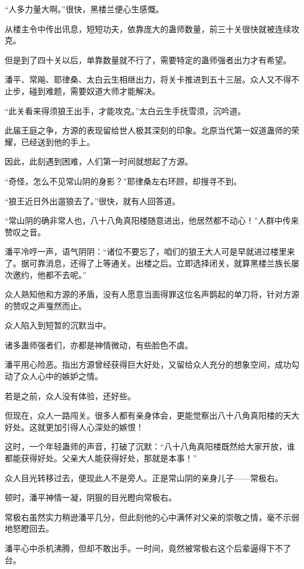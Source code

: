 \begin{this_body}
“人多力量大啊。”很快，黑楼兰便心生感慨。

从楼主令中传出讯息，短短功夫，依靠庞大的蛊师数量，前三十关很快就被连续攻克。

但是到了四十关以后，单靠数量就不行了，需要特定的蛊师强者出力才有希望。

潘平、常飚、耶律桑、太白云生相继出力，将关卡推进到五十三层。众人又不得不止步，碰到难题，需要奴道大师才能解决。

“此关看来得须狼王出手，才能攻克。”太白云生手抚雪须，沉吟道。

此届王庭之争，方源的表现留给世人极其深刻的印象。北原当代第一奴道蛊师的荣耀，已经送到他的手上。

因此，此刻遇到困难，人们第一时间就想起了方源。

“奇怪，怎么不见常山阴的身影？”耶律桑左右环顾，却搜寻不到。

“狼王近日外出遛狼去了。”很快，就有人回答道。

“常山阴的确非常人也，八十八角真阳楼随意进出，他居然都不动心！”人群中传来赞叹之音。

潘平冷哼一声，语气阴阴：“诸位不要忘了，咱们的狼王大人可是早就进过楼里来了。据可靠消息，还得了上等通关。出楼之后。立即选择闭关，就算黑楼兰族长屡次邀约，他都不去呢。”

众人熟知他和方源的矛盾，没有人愿意当面得罪这位名声鹊起的单刀将，针对方源的赞叹之声戛然而止。

众人陷入到短暂的沉默当中。

诸多蛊师强者们，亦都是神情微动，有些脸色不虞。

潘平用心险恶。指出方源曾经获得巨大好处，又留给众人充分的想象空间，成功勾动了众人心中的嫉妒之情。

若是之前，众人没有体验，还好些。

但现在，众人一路闯关。很多人都有亲身体会，更能觉察出八十八角真阳楼的天大好处。这就更加引得人心深处的嫉恨！

这时，一个年轻蛊师的声音，打破了沉默：“八十八角真阳楼既然给大家开放，谁都能获得好处。父亲大人能获得好处，那就是本事！”

众人目光转移过去，便现此人不是旁人。正是常山阴的亲身儿子——常极右。

顿时，潘平神情一凝，阴狠的目光瞪向常极右。

常极右虽然实力稍逊潘平几分，但此刻他的心中满怀对父亲的崇敬之情，毫不示弱地怒瞪回去。

潘平心中杀机沸腾，但却不敢出手。一时间，竟然被常极右这个后辈逼得下不了台。


\end{this_body}
